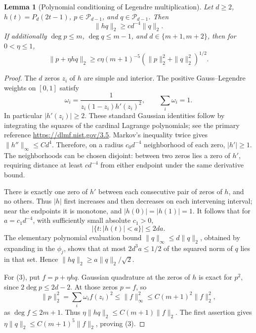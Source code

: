 \documentclass[11pt]{article}
\newtheorem{lemma}{Lemma}
\newcommand{\PP}{\mathcal P}
\begin{document}
\begin{lemma}[Polynomial conditioning of Legendre multiplication]\label{condition}
Let $d\ge2$, $h(t)=P_d(2t-1)$, $p\in\PP_{d-1}$, and
$q\in\PP_{d-1}$. Then
\[
 \|h q\|_2\ge c d^{-4}\|q\|_2.
\]
If additionally $\deg p\le m$, $\deg q\le m-1$, and
$d\in\{m+1,m+2\}$, then for $0<\eta\le1$,
\[
 \|p+\eta hq\|_2\ge c\eta(m+1)^{-5}
                    (\|p\|_2^2+\|q\|_2^2)^{1/2}.\tag{3}
\]
\end{lemma}
\begin{proof}
The $d$ zeros $z_i$ of $h$ are simple and interior. The positive
Gauss--Legendre weights on $[0,1]$ satisfy
\[
 \omega_i=\frac1{z_i(1-z_i)h'(z_i)^2},\qquad
 \sum_i\omega_i=1.
\]
In particular $|h'(z_i)|\ge2$. These standard Gaussian identities
follow by integrating the squares of the cardinal Lagrange polynomials;
see the primary reference \url{https://dlmf.nist.gov/3.5}.
Markov's inequality twice gives $\|h''\|_\infty\le C d^4$.
Therefore, on a radius $c_0d^{-4}$ neighborhood of each zero,
$|h'|\ge1$. The neighborhoods can be chosen disjoint: between two
zeros lies a zero of $h'$, requiring distance at least $c d^{-4}$
from either endpoint under the same derivative bound.

There is exactly one zero of $h'$ between each consecutive pair of
zeros of $h$, and no others. Thus $|h|$ first increases and then
decreases on each intervening interval; near the endpoints it is
monotone, and $|h(0)|=|h(1)|=1$. It follows that for
$a=c_1d^{-4}$, with sufficiently small absolute $c_1>0$,
\[
 |\{t:|h(t)|<a\}|\le2da.
\]
The elementary polynomial evaluation bound
$\|q\|_\infty\le d\|q\|_2$, obtained by expanding in the
$\phi_j$, shows that at most $2d^3a\le1/2$ of the squared norm of
$q$ lies in that set. Hence $\|hq\|_2\ge a\|q\|_2/\sqrt2$.

For (3), put $f=p+\eta hq$. Gaussian quadrature at the zeros of $h$
is exact for $p^2$, since $2\deg p\le2d-2$. At those zeros $p=f$,
so
\[
 \|p\|_2^2=\sum_i\omega_i f(z_i)^2
       \le\|f\|_\infty^2\le C(m+1)^2\|f\|_2^2,
\]
as $\deg f\le2m+1$. Thus
$\eta\|hq\|_2\le C(m+1)\|f\|_2$.
The first assertion gives
$\eta\|q\|_2\le C(m+1)^5\|f\|_2$, proving (3).
\end{proof}
\end{document}
